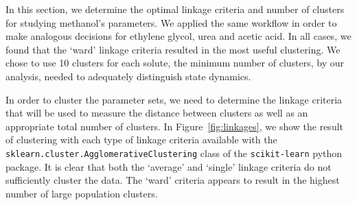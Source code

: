 \documentclass{article}
\begin{document}
  In this section, we determine the optimal linkage criteria and number of clusters
  for studying methanol's parameters. We applied the same workflow in order to make
  analogous decisions for ethylene glycol, urea and acetic acid. In all cases, we 
  found that the `ward' linkage criteria resulted in the most useful clustering. 
  We chose to use 10 clusters for each solute, the minimum number of clusters, by our
  analysis, needed to adequately distinguish state dynamics.
  
  In order to cluster the parameter sets, we need to determine the linkage criteria 
  that will be used to measure the distance between clusters as well as an appropriate
  total number of clusters. In Figure~\ref{fig:linkages}, we show the result of clustering
  with each type of linkage criteria available with the \\
  \texttt{sklearn.cluster.AgglomerativeClustering} class of the \texttt{scikit-learn} 
  python package. It is clear that both the `average' and `single' linkage criteria 
  do not sufficiently cluster the data. The `ward' criteria appears to result in the 
  highest number of large population clusters.
  
\end{document}
